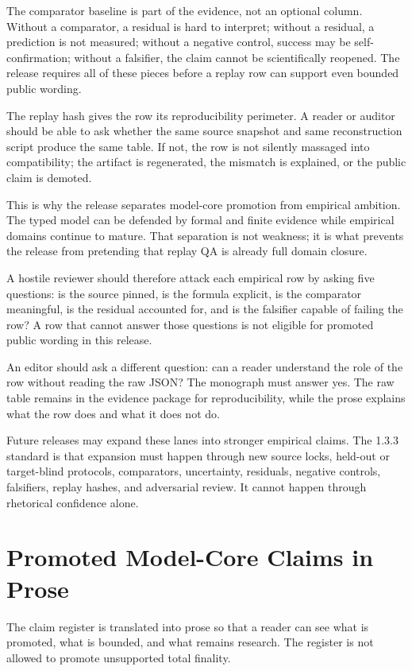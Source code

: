 The comparator baseline is part of the evidence, not an optional column. Without a comparator, a residual is hard to interpret; without a residual, a prediction is not measured; without a negative control, success may be self-confirmation; without a falsifier, the claim cannot be scientifically reopened. The release requires all of these pieces before a replay row can support even bounded public wording.

The replay hash gives the row its reproducibility perimeter. A reader or auditor should be able to ask whether the same source snapshot and same reconstruction script produce the same table. If not, the row is not silently massaged into compatibility; the artifact is regenerated, the mismatch is explained, or the public claim is demoted.

This is why the release separates model-core promotion from empirical ambition. The typed model can be defended by formal and finite evidence while empirical domains continue to mature. That separation is not weakness; it is what prevents the release from pretending that replay QA is already full domain closure.

A hostile reviewer should therefore attack each empirical row by asking five questions: is the source pinned, is the formula explicit, is the comparator meaningful, is the residual accounted for, and is the falsifier capable of failing the row? A row that cannot answer those questions is not eligible for promoted public wording in this release.

An editor should ask a different question: can a reader understand the role of the row without reading the raw JSON? The monograph must answer yes. The raw table remains in the evidence package for reproducibility, while the prose explains what the row does and what it does not do.

Future releases may expand these lanes into stronger empirical claims. The 1.3.3 standard is that expansion must happen through new source locks, held-out or target-blind protocols, comparators, uncertainty, residuals, negative controls, falsifiers, replay hashes, and adversarial review. It cannot happen through rhetorical confidence alone.


\section{Promoted Model-Core Claims in Prose}
The claim register is translated into prose so that a reader can see what is promoted, what is bounded, and what remains research. The register is not allowed to promote unsupported total finality.

